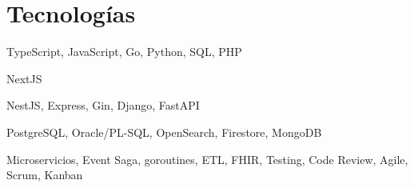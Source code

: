 \vspace{-6pt}
\section{Tecnologías}
{\small
        \begin{description}[leftmargin=2.5cm, style=sameline, nosep]
                \item[\textbf{Lenguajes}] TypeScript, JavaScript, Go,
                        Python, SQL, PHP
                \item[\textbf{Frontend}] NextJS
                \item[\textbf{Backend}] NestJS, Express, Gin, Django, FastAPI
                \item[\textbf{Datos}] PostgreSQL, Oracle/PL-SQL, OpenSearch,
                        Firestore, MongoDB
                \item[\textbf{Prácticas}] Microservicios, Event Saga,
                        goroutines, ETL, FHIR, Testing, Code Review,
                        Agile, Scrum, Kanban
        \end{description}
}


